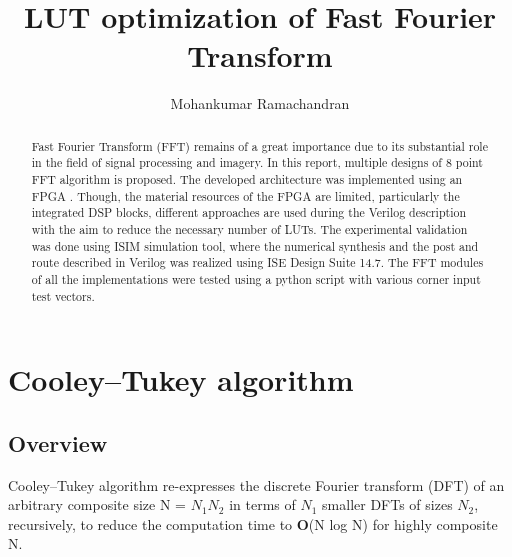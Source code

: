 \documentclass{article}
\begin{document}
\title{ LUT optimization of Fast Fourier Transform }
\author{ Mohankumar Ramachandran }

\maketitle

\begin{abstract}
Fast Fourier Transform (FFT) remains of a great importance due to its substantial role in the field of signal processing and imagery. In this report, multiple designs of 8 point FFT  algorithm is proposed. The developed architecture was implemented using an FPGA . Though, the material resources of the FPGA are limited, particularly the integrated DSP blocks, different approaches are used during the Verilog description with the aim to reduce the necessary number of LUTs. The experimental validation was done using ISIM simulation tool, where the numerical synthesis and the post and route described in Verilog was realized using ISE Design Suite 14.7. The FFT modules of all the implementations were tested using a python script with various corner input test vectors.
\end{abstract}


\section{Cooley–Tukey algorithm }
\label{raw_Cooley_Tukey_algorithm}

\subsection{Overview}
Cooley–Tukey algorithm re-expresses the discrete Fourier transform (DFT) of an arbitrary composite size N = $N_1N_2$ in terms of $N_1$ smaller DFTs of sizes $N_2$, recursively, to reduce the computation time to \textbf{O}(N log N) for highly composite N.
\end{document}
